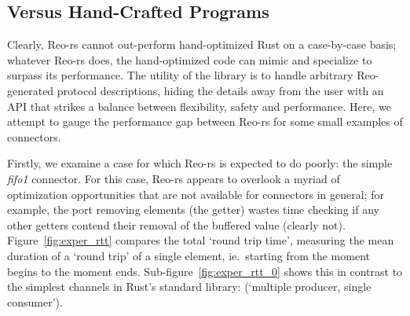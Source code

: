 \subsection{Versus Hand-Crafted Programs}

Clearly, Reo-rs cannot out-perform hand-optimized Rust on a case-by-case basis; whatever Reo-rs does, the hand-optimized code can mimic and specialize to surpass its performance. The utility of the library is to handle arbitrary Reo-generated protocol descriptions, hiding the details away from the user with an API that strikes a balance between flexibility, safety and performance. Here, we attempt to gauge the performance gap between Reo-rs for some small examples of connectors.

Firstly, we examine a case for which Reo-rs is expected to do poorly: the simple \textit{fifo1} connector. For this case, Reo-rs appears to overlook a myriad of optimization opportunities that are not available for connectors in general; for example, the port removing elements (the getter) wastes time checking if any other getters contend their removal of the buffered value (clearly not). Figure~\ref{fig:exper_rtt} compares the total `round trip time', measuring the mean duration of a `round trip' of a single element, ie.\ starting from the moment  begins to the moment  ends. Sub-figure~\ref{fig:exper_rtt_0} shows this in contrast to the simplest channels in Rust's standard library:  (`multiple producer, single consumer').


